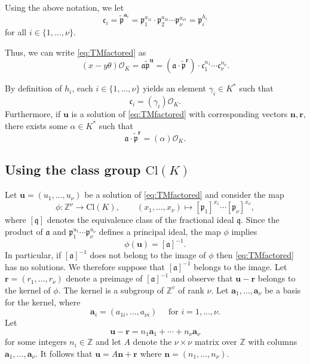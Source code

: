 \documentclass[11pt]{report}
\theoremstyle{definition}
\begin{document}
Using the above notation, we let
\[\mathfrak{c}_i = \tilde{\mathfrak{p}}^{\mathbf{a}_i}=\mathfrak{p}_1^{a_{1i}}\cdot \mathfrak{p}_2^{a_{2i}} \cdots \mathfrak{p}_{\nu}^{a_{{\nu}i}} = \mathfrak{p}_i^{h_i} \]
for all $i \in \{1, \dots, {\nu}\}$.

Thus, we can write \eqref{eq:TMfactored} as
\[ (x-y\theta) \mathcal{O}_K = \mathfrak{a} \tilde{\mathfrak{p}}^{\mathbf{u}}  = (\mathfrak{a} \cdot \tilde{\mathfrak{p}}^\mathbf{r}) \cdot \mathfrak{c}_1^{n_1}\cdots \mathfrak{c}_{\nu}^{n_{\nu}}.\]

By definition of $h_i$, each $i \in \{1, \dots, {\nu}\}$ yields an element $\gamma_i \in K^*$ such that
\[\mathfrak{c}_i = (\gamma_i) \mathcal{O}_K.\]
Furthermore, if $\mathbf{u}$ is a solution of \eqref{eq:TMfactored} with corresponding vectors $\mathbf{n}, \mathbf{r}$, there exists some $\alpha \in K^*$ such that
\[\mathfrak{a} \cdot \tilde{\mathfrak{p}}^\mathbf{r}= (\alpha)\mathcal{O}_K.\]


\subsection{Using the class group $\text{Cl}(K)$}
\label{subsec:FactorizationTMwithOK}

Let $\mathbf{u}=(u_1,\dots, u_{\nu})$ be a solution of \eqref{eq:TMfactored} and consider the map
\[\phi : \mathbb{Z}^{\nu} \rightarrow \text{Cl}(K), \qquad (x_1,\dots ,x_{\nu}) \mapsto [\mathfrak{p}_1]^{x_1}\cdots [\mathfrak{p}_{\nu}]^{x_{\nu}},\]
where $[ \mathfrak{q} ]$ denotes the equivalence class of the fractional ideal $\mathfrak{q}$.
Since the product of $\mathfrak{a}$ and $\mathfrak{p}_1^{u_1}\cdots \mathfrak{p}_{\nu}^{u_{\nu}}$ defines a principal ideal, the map $\phi$ implies
\[\phi(\mathbf{u})=[\mathfrak{a}]^{-1}.\]
In particular, if $[\mathfrak{a}]^{-1}$ does not belong to the image of $\phi$ then \eqref{eq:TMfactored} has no solutions. We therefore suppose that $[\mathfrak{a}]^{-1}$ belongs to the image. Let $\mathbf{r}=(r_1,\dotsc,r_{\nu})$ denote a preimage of $[\mathfrak{a}]^{-1}$ and observe that $\mathbf{u} - \mathbf{r}$ belongs to the kernel of $\phi$. The kernel is a subgroup of $\mathbb{Z}^v$ of rank $\nu$. Let $\mathbf{a}_1,\dots,\mathbf{a}_{\nu}$ be a basis for the kernel, where
\[\mathbf{a}_i = (a_{1i}, \dots, a_{\nu i}) \quad \text{ for } i = 1, \dots, \nu.\]
Let
\[\mathbf{u}-\mathbf{r}=n_1 \mathbf{a}_1+\cdots + n_{\nu} \mathbf{a}_{\nu}\]
for some integers $n_i \in \mathbb{Z}$ and let $A$ denote the $\nu \times \nu$ matrix over $\mathbb{Z}$ with columns $\mathbf{a}_1,\dots,\mathbf{a}_{\nu}$. It follows that $\mathbf{u}= A\mathbf{n}+\mathbf{r}$ where $\mathbf{n} = (n_1,\dots,n_{\nu})$.
\end{document}
